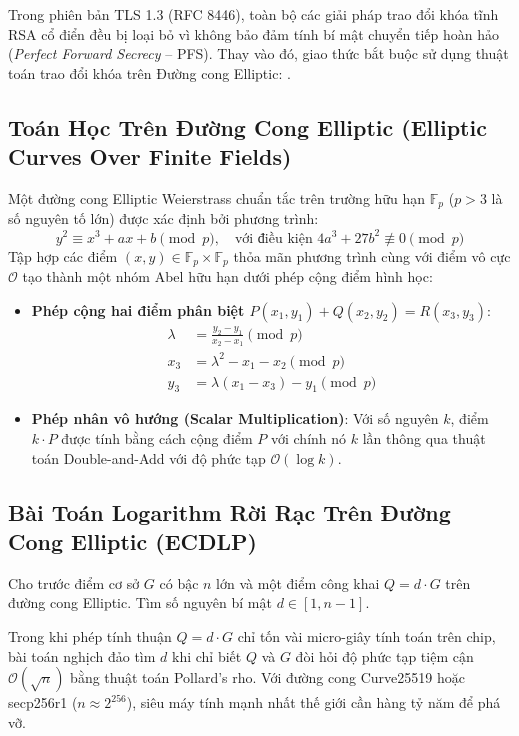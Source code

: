Trong phiên bản TLS 1.3 (RFC 8446), toàn bộ các giải pháp trao đổi khóa tĩnh RSA cổ điển đều bị loại bỏ vì không bảo đảm tính bí mật chuyển tiếp hoàn hảo (\textit{Perfect Forward Secrecy} -- PFS). Thay vào đó, giao thức bắt buộc sử dụng thuật toán trao đổi khóa trên Đường cong Elliptic: .

\subsection{Toán Học Trên Đường Cong Elliptic (Elliptic Curves Over Finite Fields)}

Một đường cong Elliptic Weierstrass chuẩn tắc trên trường hữu hạn $\mathbb{F}_p$ ($p > 3$ là số nguyên tố lớn) được xác định bởi phương trình:
\begin{equation}
y^2 \equiv x^3 + a x + b \pmod p, \quad \text{với điều kiện } 4a^3 + 27b^2 \not\equiv 0 \pmod p
\end{equation}
Tập hợp các điểm $(x, y) \in \mathbb{F}_p \times \mathbb{F}_p$ thỏa mãn phương trình cùng với điểm vô cực $\mathcal{O}$ tạo thành một nhóm Abel hữu hạn dưới phép cộng điểm hình học:
\begin{itemize}
  \item \textbf{Phép cộng hai điểm phân biệt $P(x_1, y_1) + Q(x_2, y_2) = R(x_3, y_3)$}:
  \begin{align}
  \lambda &= \frac{y_2 - y_1}{x_2 - x_1} \pmod p \\
  x_3 &= \lambda^2 - x_1 - x_2 \pmod p \\
  y_3 &= \lambda(x_1 - x_3) - y_1 \pmod p
  \end{align}
  \item \textbf{Phép nhân vô hướng (Scalar Multiplication)}: Với số nguyên $k$, điểm $k \cdot P$ được tính bằng cách cộng điểm $P$ với chính nó $k$ lần thông qua thuật toán Double-and-Add với độ phức tạp $\mathcal{O}(\log k)$.
\end{itemize}

\subsection{Bài Toán Logarithm Rời Rạc Trên Đường Cong Elliptic (ECDLP)}
\begin{definition}
Cho trước điểm cơ sở $G$ có bậc $n$ lớn và một điểm công khai $Q = d \cdot G$ trên đường cong Elliptic. Tìm số nguyên bí mật $d \in [1, n-1]$.
\end{definition}
Trong khi phép tính thuận $Q = d \cdot G$ chỉ tốn vài micro-giây tính toán trên chip, bài toán nghịch đảo tìm $d$ khi chỉ biết $Q$ và $G$ đòi hỏi độ phức tạp tiệm cận $\mathcal{O}(\sqrt{n})$ bằng thuật toán Pollard's rho. Với đường cong Curve25519 hoặc secp256r1 ($n \approx 2^{256}$), siêu máy tính mạnh nhất thế giới cần hàng tỷ năm để phá vỡ.

